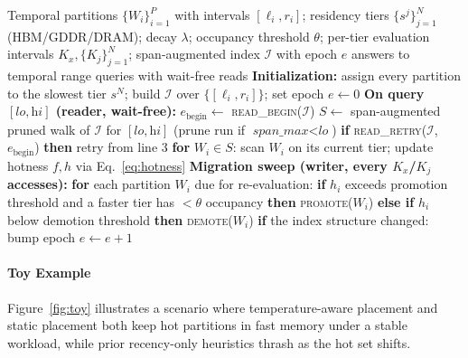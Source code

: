 \documentclass{article}
\begin{document}
\begin{algorithm}[t]
\caption{Walpurgis: Temperature-Aware Tiered Placement with Wait-Free Reads}
\label{alg:walpurgis}
\begin{algorithmic}[1]
\REQUIRE Temporal partitions $\{W_i\}_{i=1}^{P}$ with intervals $[\ell_i, r_i]$;
  residency tiers $\{s^j\}_{j=1}^{N}$ (HBM/GDDR/DRAM); decay $\lambda$;
  occupancy threshold $\theta$; per-tier evaluation intervals $K_x, \{K_j\}_{j=1}^N$;
  span-augmented index $\mathcal{I}$ with epoch $e$
\ENSURE answers to temporal range queries with wait-free reads
\medskip
\STATE \textbf{Initialization:} assign every partition to the slowest tier $s^N$;
       build $\mathcal{I}$ over $\{[\ell_i,r_i]\}$; set epoch $e \gets 0$
\medskip
\STATE \textbf{On query $[\textit{lo},\textit{hi}]$ (reader, wait-free):}
\STATE \hspace{1em} $e_{\mathrm{begin}} \gets$ \textsc{read\_begin}($\mathcal{I}$)
\STATE \hspace{1em} $S \gets$ span-augmented pruned walk of $\mathcal{I}$ for
       $[\textit{lo},\textit{hi}]$ \quad(prune run if $\textit{span\_max} < \textit{lo}$)
\STATE \hspace{1em} \textbf{if} \textsc{read\_retry}($\mathcal{I}$, $e_{\mathrm{begin}}$)
       \textbf{then} retry from line 3
\STATE \hspace{1em} \textbf{for} $W_i \in S$: scan $W_i$ on its current tier;
       update hotness $f,h$ via Eq.~\eqref{eq:hotness}
\medskip
\STATE \textbf{Migration sweep (writer, every $K_x$/$K_j$ accesses):}
\STATE \hspace{1em} \textbf{for} each partition $W_i$ due for re-evaluation:
\STATE \hspace{2em} \textbf{if} $h_i$ exceeds promotion threshold and a faster tier has
       $< \theta$ occupancy \textbf{then} \textsc{promote}($W_i$)
\STATE \hspace{2em} \textbf{else if} $h_i$ below demotion threshold \textbf{then}
       \textsc{demote}($W_i$)
\STATE \hspace{1em} \textbf{if} the index structure changed: bump epoch $e \gets e+1$
\end{algorithmic}
\end{algorithm}

\paragraph{Toy Example} Figure~\ref{fig:toy} illustrates a scenario where
temperature-aware placement and static placement both keep hot partitions in fast
memory under a stable workload, while prior recency-only heuristics thrash as the hot
set shifts.
\end{document}
